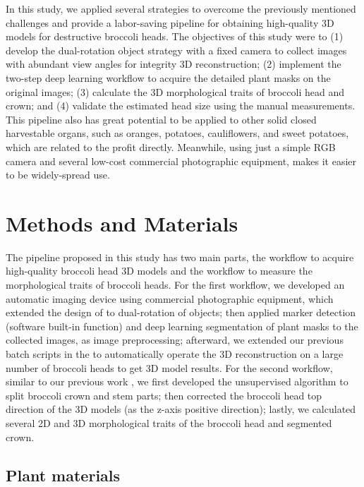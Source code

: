 In this study, we applied several strategies to overcome the previously mentioned challenges and provide a labor-saving pipeline for obtaining high-quality 3D models for destructive broccoli heads. The objectives of this study were to (1) develop the dual-rotation object strategy with a fixed camera to collect images with abundant view angles for integrity 3D reconstruction; (2) implement the two-step deep learning workflow to acquire the detailed plant masks on the original images; (3) calculate the 3D morphological traits of broccoli head and crown; and (4) validate the estimated head size using the manual measurements. This pipeline also has great potential to be applied to other solid closed harvestable organs, such as oranges, potatoes, cauliflowers, and sweet potatoes, which are related to the profit directly. Meanwhile, using just a simple RGB camera and several low-cost commercial photographic equipment, makes it easier to be widely-spread use.


\section{Methods and Materials}

The pipeline proposed in this study has two main parts, the workflow to acquire high-quality broccoli head 3D models and the workflow to measure the morphological traits of broccoli heads. For the first workflow, we developed an automatic imaging device using commercial photographic equipment, which extended the design of \citet{kochi_3d_2018} to dual-rotation of objects; then applied marker detection (software built-in function) and deep learning segmentation of plant masks to the collected images, as image preprocessing; afterward, we extended our previous batch scripts in the \citet{feldman_easydcp_2021} to automatically operate the 3D reconstruction on a large number of broccoli heads to get 3D model results. For the second workflow, similar to our previous work \citep{feldman_easydcp_2021}, we first developed the unsupervised algorithm to split broccoli crown and stem parts; then corrected the broccoli head top direction of the 3D models (as the z-axis positive direction); lastly, we calculated several 2D and 3D morphological traits of the broccoli head and segmented crown.

\subsection{Plant materials}

